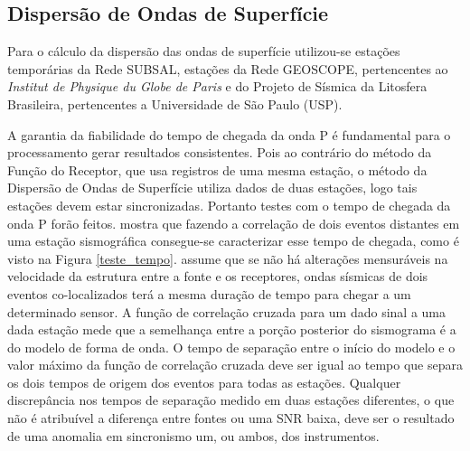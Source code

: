 \subsection{Dispersão de Ondas de Superfície}

Para o cálculo da dispersão das ondas de superfície utilizou-se estações temporárias da Rede SUBSAL, estações da Rede GEOSCOPE, pertencentes ao \textit{Institut de Physique du Globe de Paris} e do Projeto de Sísmica  da Litosfera Brasileira, pertencentes a Universidade de São Paulo (USP).

A garantia da fiabilidade do tempo de chegada da onda P é fundamental para o processamento gerar resultados consistentes. Pois ao contrário do método da Função do Receptor, que usa registros de uma mesma estação, o método da Dispersão de Ondas de Superfície utiliza dados de duas estações, logo tais estações devem estar sincronizadas. Portanto testes com o tempo de chegada da onda P forão feitos. \cite{gibbons_identification_2006} mostra que fazendo a correlação de dois eventos distantes em uma estação sismográfica consegue-se caracterizar esse tempo de chegada, como é visto na Figura \ref{teste_tempo}. \cite{gibbons_identification_2006} assume que  se não há alterações mensuráveis na velocidade da estrutura entre a fonte e os receptores, ondas sísmicas de dois eventos co-localizados terá a mesma duração de tempo para chegar a um determinado sensor. A função de correlação cruzada para um dado sinal a uma dada estação mede que a semelhança entre a porção posterior do sismograma é a do modelo de forma de onda. O tempo de separação entre o início do modelo e o valor máximo da função de correlação cruzada deve ser igual ao tempo que separa os dois tempos de origem dos eventos para todas as estações. Qualquer discrepância nos tempos de separação medido em duas estações diferentes, o que não é atribuível a diferença entre fontes ou uma SNR baixa, deve ser o resultado de uma anomalia em sincronismo um, ou ambos, dos instrumentos.

